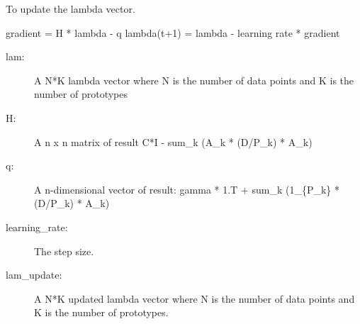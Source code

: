 \documentclass[letterpaper,10pt,english]{sphinxmanual}
\begin{document}
\begin{fulllineitems}
\begin{fulllineitems}
\label{\detokenize{index:lmlvq_distance.LMLVQ.prt_labels}}
\end{fulllineitems}


\begin{fulllineitems}
\label{\detokenize{index:lmlvq_distance.LMLVQ.update}}
To update the lambda vector.

gradient = H * lambda - q
lambda(t+1) = lambda - learning rate * gradient
\begin{description}
\item[{lam:}] \leavevmode
A N*K lambda vector where N is the number of data points and K is
the number of prototypes

\item[{H:}] \leavevmode
A n x n matrix of result C*I - sum\_k (A\_k * (D/P\_k) * A\_k)

\item[{q:}] \leavevmode
A n-dimensional vector of result:
gamma * 1.T + sum\_k (1\_\{P\_k\} * (D/P\_k) * A\_k)

\item[{learning\_rate:}] \leavevmode
The step size.

\end{description}
\begin{description}
\item[{lam\_update:}] \leavevmode
A N*K updated lambda vector where N is the number of data points
and K is the number of prototypes.

\end{description}

\end{fulllineitems}


\begin{fulllineitems}
\label{\detokenize{index:lmlvq_distance.LMLVQ.update_beta}}
\end{fulllineitems}


\end{fulllineitems}



\renewcommand{\indexname}{Python Module Index}
\begin{sphinxtheindex}
\let\bigletter\sphinxstyleindexlettergroup
\bigletter{l}
\item\relax{}
\end{sphinxtheindex}

\renewcommand{\indexname}{Index}
\printindex
\end{document}
